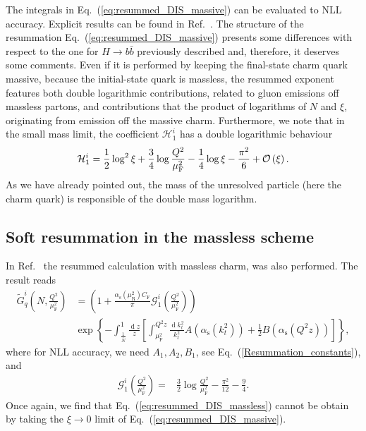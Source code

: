 \documentclass[letterpaper,11pt]{article}
\newcommand{\as}{\alpha_\text{s}}
\newcommand{\cf}{C_{\text{F}}}
\newcommand{\order}[1]{{\cal O}\left(#1\right)}
\DeclareMathOperator{\De}{d}
\newcommand{\de}{\De\!}
\newcommand{\muf}{\mu_{\text{F}}}
\newcommand{\mur}{\mu_{\text{R}}}
\begin{document}
%
The integrals in Eq.~(\ref{eq:resummed_DIS_massive}) can be evaluated to NLL accuracy. Explicit results can be found in Ref.~\cite{Corcella:2003ib}. The structure of the resummation  Eq.~(\ref{eq:resummed_DIS_massive}) presents some differences with respect to the one for $H\to b\bar b$ previously described and, therefore, it deserves some comments. 
%
Even if it is performed by keeping the final-state charm quark massive, because the initial-state quark is massless, the resummed exponent features both double logarithmic contributions, related to gluon emissions off massless partons, and contributions that the product of logarithms of $N$ and $\xi$, originating from emission off the massive charm.
%
Furthermore, we note that in the small mass limit, the coefficient $\mathcal{H}^i_1$ has a double logarithmic behaviour
\begin{equation}
\mathcal{H}^i_1=\frac{1}{2}\log^2{\xi} +\frac{3}{4} \log \frac{Q^2}{\muf^2}-\frac{1}{4} \log \xi -\frac{\pi^2}{6}
 +\order{\xi}.
\end{equation}
As we have already pointed out, the mass of the unresolved particle (here the charm quark) is responsible of the double mass logarithm. 
%

\subsection{Soft resummation in the massless scheme}\label{sec:massless_NLL}
In Ref.~\cite{Corcella:2003ib} the resummed calculation with massless charm, was also performed. The result reads
\begin{align}\label{eq:resummed_DIS_massless}
\widetilde{G}^{i}_q\left(N,\frac{Q^2}{\muf^2}\right)&
=\left(1+ \frac{\as(\mur^2)\cf }{\pi}\mathcal{G}^i_1\left(\frac{Q^2}{\muf^2}\right)\right) \nonumber \\
&
\exp\left\{-\int^{1}_{{\frac{1}{ \bar N}}} \frac{\de z}{z} \left[\int^{Q^2 z}_{\muf^2} \frac{\de k_t^2}{k_t^2} A\left(\as(k_t^2)\right)+\frac{1}{2} B\left(\as\left(Q^2z\right)\right)\right]\right\},
\end{align}
where for NLL accuracy, we need $A_1,A_2,B_1$, see Eq.~(\ref{Resummation_constants}), and
\begin{align}
		\mathcal{G}^i_1\left(\frac{Q^2}{\muf^2}\right)=& \frac{3}{2} \log \frac{Q^2}{\muf^2}-\frac{\pi^2}{12}-\frac{9}{4}.
\end{align}
Once again, we find that Eq.~(\ref{eq:resummed_DIS_massless}) cannot be obtain by taking the $\xi \to 0$ limit of Eq.~(\ref{eq:resummed_DIS_massive}).
\end{document}
